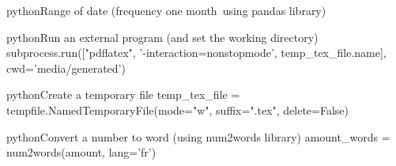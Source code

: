 \documentclass[10pt,a4paper]{article}
\begin{document}
\begin{multicols}{3}
\begin{codebox}{python}{Range of date (frequency one month\, using pandas library)}
\end{codebox}

\begin{codebox}{python}{Run an external program (and set the working directory)}
subprocess.run(["pdflatex", '-interaction=nonstopmode', temp_tex_file.name],
                       cwd='media/generated')

\end{codebox}

\begin{codebox}{python}{Create a temporary file}
temp_tex_file = tempfile.NamedTemporaryFile(mode="w", suffix=".tex", delete=False)

\end{codebox}

\begin{codebox}{python}{Convert a number to word (using num2words library)}
amount_words = num2words(amount, lang='fr')

\end{codebox}


\AtNextBibliography{\footnotesize}
\printbibliography  
\end{multicols}
\end{document}

